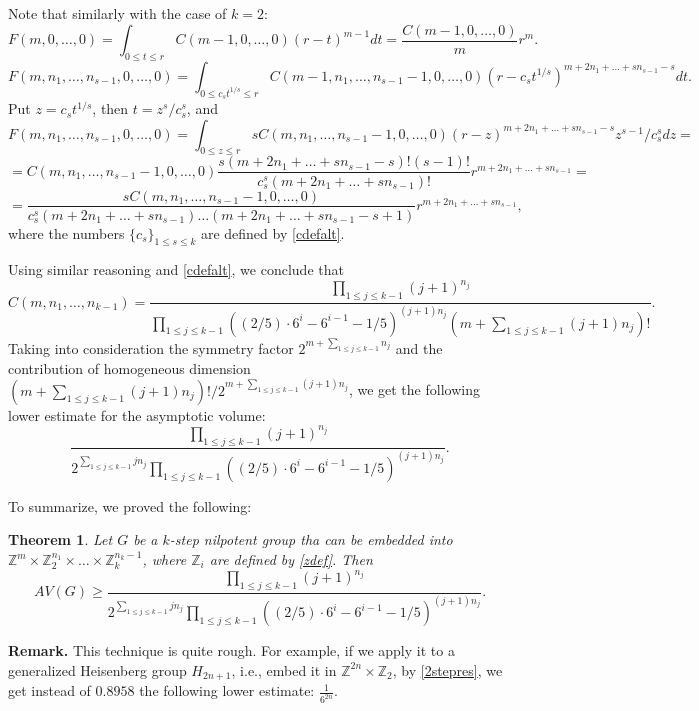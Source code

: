 \documentclass[11pt]{article}
\newcounter{razdel}[section]
\theoremstyle{Mystyle}
\newtheorem{Theorem}[razdel]{Theorem}
\begin{document}
Note that similarly with the case of $k=2$:
$$F(m,0,\ldots, 0) = \int_{0\leq t\leq r} C(m-1, 0,\ldots, 0) (r-t)^{m-1} dt = \frac{C(m-1,0,\ldots,0)}{m}r^m.$$
$$F(m,n_{1},\ldots, n_{s-1},0,\ldots,0) = \int_{0\leq c_{s}t^{1/s}\leq r} C(m-1, n_{1},\ldots, n_{s-1}-1,0,\ldots,0)(r - c_{s}t^{1/s})^{m+2n_{1}+\ldots+s n_{s-1} - s} dt.$$
Put $z=c_{s}t^{1/s}$, then $t=z^{s}/c_{s}^s$, and
$$F(m,n_1,\ldots, n_{s-1},0,\ldots,0) = \int_{0\leq z\leq r} s C(m,n_1,\ldots,n_{s-1}-1,0,\ldots,0)
(r-z)^{m+2n_{1}+\ldots+s n_{s-1} - s} z^{s-1}/c_{s}^s dz=$$
$$= C(m,n_1,\ldots,n_{s-1}-1,0,\ldots,0)\frac{s(m+2n_{1}+\ldots+s n_{s-1} - s)!(s-1)!}{c_{s}^s(m+2n_{1}+\ldots+s n_{s-1})!
} r^{m+2n_{1}+\ldots+s n_{s-1}}=$$
$$=\frac{s C(m,n_1,\ldots,n_{s-1}-1,0,\ldots,0)}{c_{s}^s(m+2n_{1}+\ldots+s n_{s-1})\ldots (m+2n_{1}+\ldots+s n_{s-1} - s + 1)}r^{m+2n_{1}+\ldots+s n_{s-1}},$$
where the numbers $\{c_{s}\}_{1\leq s\leq k}$ are defined by \eqref{cdefalt}.

Using similar reasoning and \eqref{cdefalt}, we conclude that
$$C(m,n_1,\ldots,n_{k-1}) = \frac{\prod_{1\leq j\leq k-1} (j+1)^{n_j}}{\prod_{1\leq j\leq k-1}((2/5)\cdot 6^{i} - 6^{i-1} - 1/5  )^{(j+1)n_j}(m+\sum_{1\leq j\leq k-1}(j+1)n_j)!}.$$
Taking into consideration the symmetry factor $2^{m+\sum_{1\leq j\leq k-1}n_j}$ and the contribution of homogeneous dimension $(m+\sum_{1\leq j\leq k-1}(j+1)n_j)!/2^{m+\sum_{1\leq j\leq k-1}(j+1)n_j}$, we get the following lower estimate for the asymptotic volume:
$$\frac{\prod_{1\leq j\leq k-1} (j+1)^{n_j}}{2^{\sum_{1\leq j\leq k-1}j n_j}\prod_{1\leq j\leq k-1}((2/5)\cdot 6^{i} - 6^{i-1} - 1/5)^{(j+1)n_j}}.$$

To summarize, we proved the following:
\begin{Theorem}
\label{Th3}
Let $G$ be a $k$-step nilpotent group tha can be embedded into $\mathbb{Z}^{m}\times \mathbb{Z}^{n_1}_2\times\ldots\times\mathbb{Z}^{n_k-1}_k$, where $\mathbb{Z}_i$ are defined by \eqref{zdef}. Then
$$AV(G)\geq \frac{\prod_{1\leq j\leq k-1} (j+1)^{n_j}}{2^{\sum_{1\leq j\leq k-1}j n_j}\prod_{1\leq j\leq k-1}((2/5)\cdot 6^{i} - 6^{i-1} - 1/5)^{(j+1)n_j}}.$$
\end{Theorem}

\textbf{Remark.} This technique is quite rough. For example, if we apply it to a generalized Heisenberg group $H_{2n+1}$, i.e., embed it in $\mathbb{Z}^{2n}\times\mathbb{Z}_{2}$, by \eqref{2stepres}, we get instead of $0.8958$ the following lower estimate:
$\frac{1}{6^{2n}}$.

%
%
%
%
%
\end{document}
